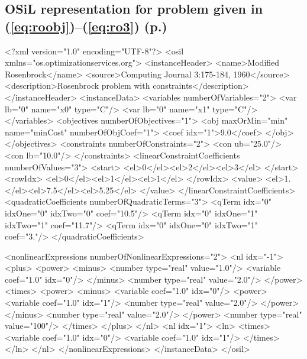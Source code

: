 \documentclass[11pt]{article}
\renewcommand{\_}{{\char"5F}}
\renewcommand{\{}{{\char"7B}}
\renewcommand{\}}{{\char"7D}}
\renewcommand{\^}{{\char"0D}}
\renewcommand{\'}{{\char"0D}}
\begin{document}
\subsection{OSiL representation for problem given in (\ref{eq:roobj})--(\ref{eq:ro3}) (p.\pageref{eq:roobj})}\label{section:rosenbrockXML}


{\normalsize \baselineskip 16pt \vspace{2pt}
\begin{verbatimtab}[5]
<?xml version="1.0" encoding="UTF-8"?>
<osil xmlns="os.optimizationservices.org">
	<instanceHeader>
		<name>Modified Rosenbrock</name>
		<source>Computing Journal 3:175-184, 1960</source>
		<description>Rosenbrock problem with constraints</description>
	</instanceHeader>
	<instanceData>
		<variables numberOfVariables="2">
			<var lb="0" name="x0" type="C"/>
			<var lb="0" name="x1" type="C"/>
		</variables>
		<objectives numberOfObjectives="1">
			<obj maxOrMin="min" name="minCost" numberOfObjCoef="1">
				<coef idx="1">9.0</coef>
			</obj>
		</objectives>
		<constraints numberOfConstraints="2">
			<con ub="25.0"/>
			<con lb="10.0"/>
		</constraints>
		<linearConstraintCoefficients numberOfValues="3">
			<start>
				<el>0</el><el>2</el><el>3</el>
			</start>
			<rowIdx>
				<el>0</el><el>1</el><el>1</el>
			</rowIdx>
			<value>
				<el>1.</el><el>7.5</el><el>5.25</el>
			</value>
		</linearConstraintCoefficients>
		<quadraticCoefficients numberOfQuadraticTerms="3">
			<qTerm idx="0" idxOne="0" idxTwo="0" coef="10.5"/>
			<qTerm idx="0" idxOne="1" idxTwo="1" coef="11.7"/>
			<qTerm idx="0" idxOne="0" idxTwo="1" coef="3."/>
		</quadraticCoefficients>
\end{verbatimtab}
   \newpage
\begin{verbatimtab}[5]
		<nonlinearExpressions numberOfNonlinearExpressions="2">
			<nl idx="-1">
				<plus>
					<power>
						<minus>
							<number type="real" value="1.0"/>
							<variable coef="1.0" idx="0"/>
						</minus>
						<number type="real" value="2.0"/>
					</power>
					<times>
						<power>
							<minus>
								<variable coef="1.0" idx="0"/>
								<power>
									<variable coef="1.0" idx="1"/>
									<number type="real" value="2.0"/>
								</power>
							</minus>
							<number type="real" value="2.0"/>
						</power>
						<number type="real" value="100"/>
					</times>
				</plus>
			</nl>
			<nl idx="1">
				<ln>
					<times>
						<variable coef="1.0" idx="0"/>
						<variable coef="1.0" idx="1"/>
					</times>
				</ln>
			</nl>
		</nonlinearExpressions>
	</instanceData>
</osil>
\end{verbatimtab}

}%
\end{document}
